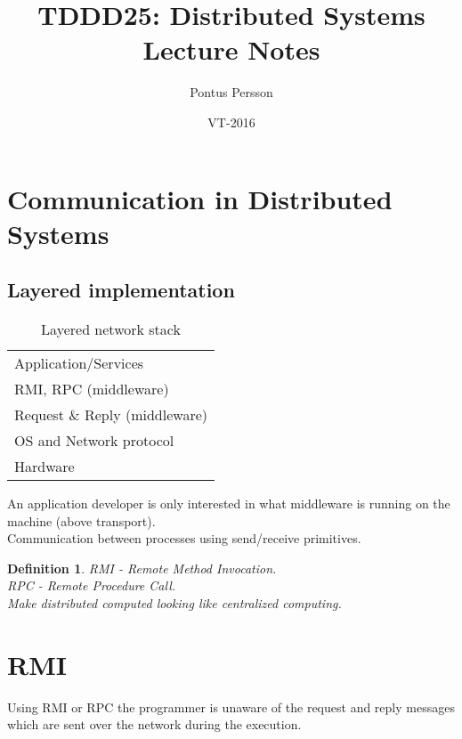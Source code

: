 \documentclass[a4paper]{article}
\title{TDDD25: Distributed Systems\\Lecture Notes}
\author{Pontus Persson}
\date{VT-2016}
\newtheorem{definition}{Definition}
\begin{document}
\maketitle
\tableofcontents
\section{Communication in Distributed Systems}
\subsection{Layered implementation}
\begin{table}[H]
	\centering
	\begin{tabular}{l}
		Application/Services\\
		RMI, RPC (middleware)\\
		Request \& Reply (middleware)\\
		OS and Network protocol\\
		Hardware
	\end{tabular}
	\caption{Layered network stack}
\end{table}
An application developer is only interested in what middleware is running on the
machine (above transport).\\
Communication between processes using send/receive primitives.
\begin{definition}
	RMI - Remote Method Invocation. \\
	RPC - Remote Procedure Call.\\
	Make distributed computed looking like
	centralized computing.
\end{definition}
\section{RMI}
Using RMI or RPC the programmer is unaware of the request and reply messages
which are sent over the network during the execution.
\end{document}

